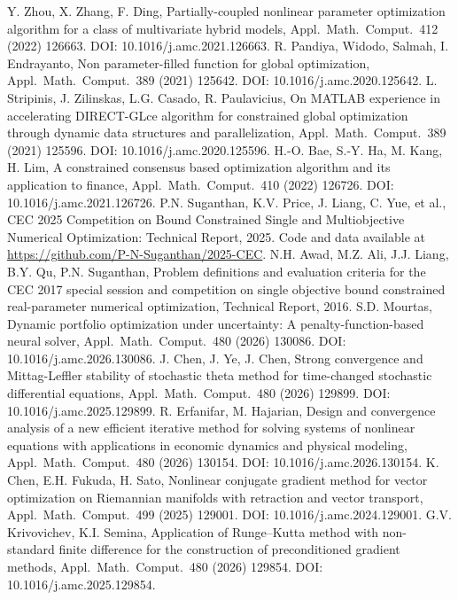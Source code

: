 \documentclass[review]{elsarticle}
\theoremstyle{definition}
\begin{document}
\begin{enumerate}
 Y. Zhou, X. Zhang, F. Ding, Partially-coupled nonlinear parameter optimization algorithm for a class of multivariate hybrid models, Appl.\ Math.\ Comput.\ 412 (2022) 126663. DOI: 10.1016/j.amc.2021.126663.
 R. Pandiya, Widodo, Salmah, I. Endrayanto, Non parameter-filled function for global optimization, Appl.\ Math.\ Comput.\ 389 (2021) 125642. DOI: 10.1016/j.amc.2020.125642.
 L. Stripinis, J. Zilinskas, L.G. Casado, R. Paulavicius, On MATLAB experience in accelerating DIRECT-GLce algorithm for constrained global optimization through dynamic data structures and parallelization, Appl.\ Math.\ Comput.\ 389 (2021) 125596. DOI: 10.1016/j.amc.2020.125596.
 H.-O. Bae, S.-Y. Ha, M. Kang, H. Lim, A constrained consensus based optimization algorithm and its application to finance, Appl.\ Math.\ Comput.\ 410 (2022) 126726. DOI: 10.1016/j.amc.2021.126726.
 P.N. Suganthan, K.V. Price, J. Liang, C. Yue, et al., CEC 2025 Competition on Bound Constrained Single and Multiobjective Numerical Optimization: Technical Report, 2025. Code and data available at \url{https://github.com/P-N-Suganthan/2025-CEC}.
 N.H. Awad, M.Z. Ali, J.J. Liang, B.Y. Qu, P.N. Suganthan, Problem definitions and evaluation criteria for the CEC 2017 special session and competition on single objective bound constrained real-parameter numerical optimization, Technical Report, 2016.
 S.D. Mourtas, Dynamic portfolio optimization under uncertainty: A penalty-function-based neural solver, Appl.\ Math.\ Comput.\ 480 (2026) 130086. DOI: 10.1016/j.amc.2026.130086.
 J. Chen, J. Ye, J. Chen, Strong convergence and Mittag-Leffler stability of stochastic theta method for time-changed stochastic differential equations, Appl.\ Math.\ Comput.\ 480 (2026) 129899. DOI: 10.1016/j.amc.2025.129899.
 R. Erfanifar, M. Hajarian, Design and convergence analysis of a new efficient iterative method for solving systems of nonlinear equations with applications in economic dynamics and physical modeling, Appl.\ Math.\ Comput.\ 480 (2026) 130154. DOI: 10.1016/j.amc.2026.130154.
 K. Chen, E.H. Fukuda, H. Sato, Nonlinear conjugate gradient method for vector optimization on Riemannian manifolds with retraction and vector transport, Appl.\ Math.\ Comput.\ 499 (2025) 129001. DOI: 10.1016/j.amc.2024.129001.
 G.V. Krivovichev, K.I. Semina, Application of Runge--Kutta method with non-standard finite difference for the construction of preconditioned gradient methods, Appl.\ Math.\ Comput.\ 480 (2026) 129854. DOI: 10.1016/j.amc.2025.129854.
\end{enumerate}
\end{document}

